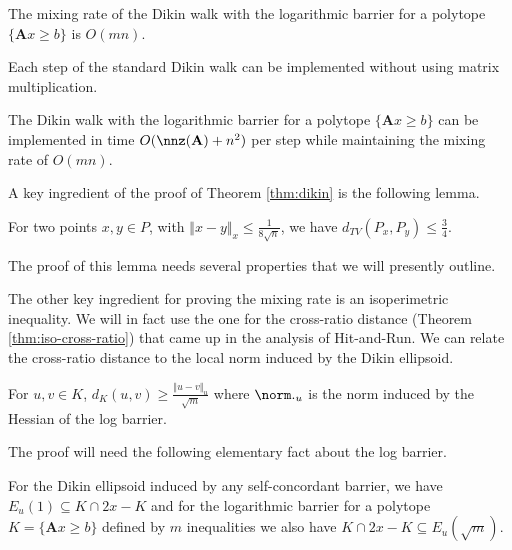 \begin{thm}
\label{thm:dikin}The mixing rate of the Dikin walk with the logarithmic
barrier for a polytope $\{\mathbf{A}x\ge b\}$ is $O(mn)$.
\end{thm}

Each step of the standard Dikin walk can be implemented without using
matrix multiplication.
\begin{thm}
\label{thm:dikin-fast}The Dikin walk with the logarithmic barrier
for a polytope $\{\mathbf{A}x\ge b\}$ can be implemented in time
$O(\nnz(\mathbf{A})+n^{2})$ per step while maintaining the mixing
rate of $O(mn)$.
\end{thm}

A key ingredient of the proof of Theorem \ref{thm:dikin} is the following
lemma.
\begin{lem}
\label{lem:dikin-one-step-1}For two points $x,y\in P$, with $\Vert x-y\Vert_{x}\le\frac{1}{8\sqrt{n}}$,
we have $d_{TV}(P_{x},P_{y})\leq\frac{3}{4}$.
\end{lem}

The proof of this lemma needs several properties that we will presently
outline. 

The other key ingredient for proving the mixing rate is an isoperimetric
inequality. We will in fact use the one for the cross-ratio distance
(Theorem \ref{thm:iso-cross-ratio}) that came up in the analysis
of Hit-and-Run. We can relate the cross-ratio distance to the local
norm induced by the Dikin ellipsoid.
\begin{lem}
\label{lem:dikin-dist-1}For $u,v\in K$, $d_{K}(u,v)\ge\frac{\Vert u-v\Vert_{u}}{\sqrt{m}}$
where $\norm ._{u}$ is the norm induced by the Hessian of the log
barrier. 
\end{lem}

The proof will need the following elementary fact about the log barrier.
\begin{lem}
\label{lem:dikin_sandwich}For the Dikin ellipsoid induced by any
self-concordant barrier, we have $E_{u}(1)\subseteq K\cap2x-K$ and
for the logarithmic barrier for a polytope $K=\{\mathbf{A}x\ge b\}$
defined by $m$ inequalities we also have $K\cap2x-K\subseteq E_{u}(\sqrt{m})$.
\end{lem}

